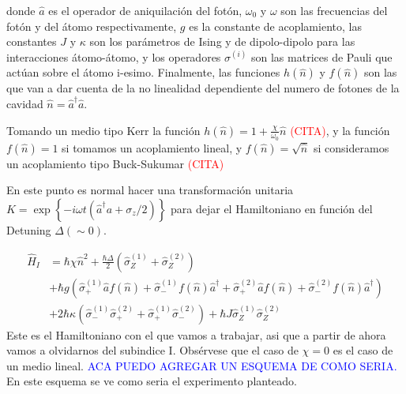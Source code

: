 donde $\hat a$ es el operador de aniquilaci\'on del fot\'on, $\omega_0$ y $\omega$ son las frecuencias del fot\'on y del átomo respectivamente, $g$ es la constante de acoplamiento, las constantes $J$ y $\kappa$ son los par\'ametros de Ising y de dipolo-dipolo para las interacciones átomo-átomo, y los operadores $\sigma^{(i)}$ son las matrices de Pauli que act\'uan sobre el átomo i-esimo. Finalmente, las funciones $h(\hat n)$ y $f(\hat n)$ son las que van a dar cuenta de la no linealidad dependiente del numero de fotones de la cavidad $\hat n = \hat a^\dagger \hat a$. 

Tomando un medio tipo Kerr la funci\'on $h(\hat n)=1+\frac{\chi}{\omega_0}\hat n$ \cite{}\textcolor{red}{(CITA)}, y la funci\'on $f(\hat n) =1$ si tomamos un acoplamiento lineal, y $f(\hat n) = \sqrt{\hat n}$ si consideramos un acoplamiento tipo Buck-Sukumar \cite{}\textcolor{red}{(CITA)}

En este punto es normal hacer una transformaci\'on unitaria  $K = \exp\left\{-i \omega t (\hat a^\dagger a + \sigma_z/2)\right\}$ para dejar el Hamiltoniano en funci\'on del Detuning $\Delta (\sim 0)$. 

\begin{equation}
\begin{split}
     \hat H_I & =\hbar \chi \hat n^2+\frac{\hbar \Delta}{2}(\hat\sigma_Z^{(1)}+\hat\sigma_Z^{(2)})   \\ 
     & + \hbar g(\hat\sigma_+^{(1)}\hat a f(\hat n)+\hat\sigma_-^{(1)}f(\hat n) \hat a^\dagger + \hat\sigma_+^{(2)}\hat a f(\hat n)+\hat\sigma_-^{(2)}f(\hat n) \hat a^\dagger) \\ 
 & + 2\hbar \kappa (\hat \sigma_-^{(1)}\hat \sigma_+^{(2)}+\hat \sigma_+^{(1)}\hat \sigma_-^{(2)}) + \hbar J \hat \sigma_Z^{(1)}\hat \sigma_Z^{(2)}
\end{split}
\end{equation}
Este es el Hamiltoniano con el que vamos a trabajar, asi que a partir de ahora vamos a olvidarnos del subindice I. Obsérvese que el caso de $\chi=0$ es el caso de un medio lineal. 
\textcolor{blue}{ACA PUEDO AGREGAR UN ESQUEMA DE COMO SERIA.} En este esquema se ve como seria el experimento planteado. 

